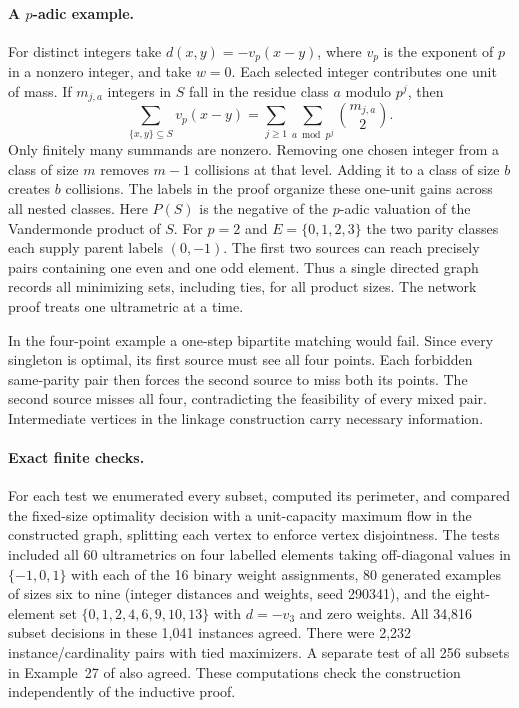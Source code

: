 \documentclass[11pt,a4paper]{article}
\begin{document}
\paragraph{A $p$-adic example.}
For distinct integers take $d(x,y)=-v_p(x-y)$, where $v_p$ is the exponent
of $p$ in a nonzero integer, and take $w=0$. Each selected integer contributes one unit of mass. If $m_{j,a}$ integers in $S$ fall in the residue class $a$ modulo $p^j$, then
\[
  \sum_{\{x,y\}\subseteq S}v_p(x-y)
  =\sum_{j\ge1}\sum_{a\bmod p^j}\binom{m_{j,a}}{2}.
\]
Only finitely many summands are nonzero. Removing one chosen integer from a class of size $m$ removes $m-1$ collisions at that level. Adding it to a class of size $b$ creates $b$ collisions. The labels in the proof organize these one-unit gains across all nested classes. Here $P(S)$ is the negative of
the $p$-adic valuation of the Vandermonde product of $S$. For $p=2$ and
$E=\{0,1,2,3\}$ the two parity classes each supply parent labels $(0,-1)$.
The first two sources can reach precisely pairs containing one even and one
odd element. Thus a single directed graph records all minimizing sets,
including ties, for all product sizes. The network proof treats one
ultrametric at a time.

In the four-point example a one-step bipartite matching would fail. Since every singleton is optimal, its first source must see all four points. Each forbidden same-parity pair then forces the second source to miss both its points. The second source misses all four, contradicting the feasibility of every mixed pair. Intermediate vertices in the linkage construction carry necessary information.

\paragraph{Exact finite checks.}
For each test we enumerated every subset, computed its perimeter, and compared the fixed-size optimality decision with a unit-capacity maximum flow in the constructed graph, splitting each vertex to enforce vertex disjointness. The tests included all 60 ultrametrics on four labelled elements taking off-diagonal values in $\{-1,0,1\}$ with each of the 16 binary weight assignments, 80 generated examples of sizes six to nine (integer distances and weights, seed 290341), and the eight-element set $\{0,1,2,4,6,9,10,13\}$ with $d=-v_3$ and zero weights. All 34,816 subset decisions in these 1,041 instances agreed. There were 2,232 instance/cardinality pairs with tied maximizers. A separate test of all 256 subsets in Example~27 of \cite{gp} also agreed. These computations check the construction independently of the inductive proof.
\end{document}
